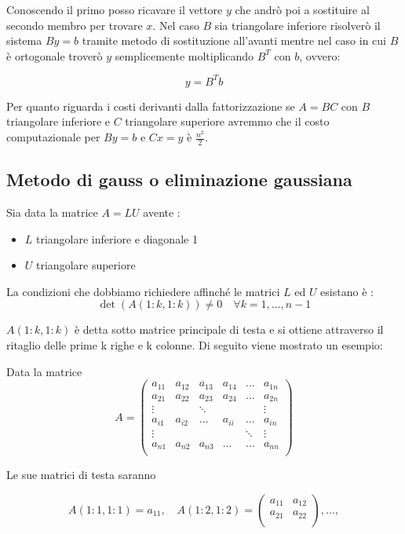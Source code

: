 \documentclass[12pt, a4paper]{book}
\theoremstyle{definition}
\begin{document}
\begin{flushleft}
Conoscendo il primo posso ricavare il vettore $y$ che andrò poi a sostituire al secondo membro per trovare $x$.  Nel caso $B$ sia triangolare inferiore risolverò il sistema $By = b$ tramite metodo di sostituzione all'avanti mentre nel caso in cui $B$ è ortogonale troverò $y$ semplicemente moltiplicando $B^{T}$ con $b$, ovvero:

 \[ 
		y = B^{T}b
\]

Per quanto riguarda i costi derivanti dalla fattorizzazione se $A = BC$ con $B$ triangolare inferiore e $C$ triangolare superiore avremmo che il costo computazionale per $By = b$ e  $Cx = y$ è $\frac{n^{2}}{2}$.
\end{flushleft}

\subsection{Metodo di gauss o eliminazione gaussiana}
\begin{flushleft}

Sia data la matrice $A = LU$  avente : 

\begin{itemize}
	\item $L$ triangolare inferiore e diagonale 1 
	\item $U$ triangolare superiore
\end{itemize}

La condizioni che dobbiamo richiedere affinché le matrici $L$ ed $U$ esistano è :
\[
	\det(A(1:k, 1:k)) \neq 0 \quad \forall k = 1, \dots, n-1
\]

$A(1:k, 1:k)$ è detta sotto matrice principale di testa e si ottiene attraverso il ritaglio delle prime k righe e k colonne. Di seguito viene mostrato un esempio: 

Data la matrice 
\[
	A = 
	\begin{pmatrix}
		a_{11} & a_{12} & a_{13} & a_{14} & \dots & a_{1n} \\
		a_{21} & a_{22} & a_{23} & a_{24} & \dots & a_{2n} \\
		\vdots & & \ddots &  & & \vdots \\
		a_{i1} & a_{i2} & \dots & a_{ii} & \dots & a_{in} \\
		\vdots & & & & \ddots &   \vdots \\
		a_{n1} & a_{n2} & a_{n3} & \dots &  \dots & a_{nn} \\
	\end{pmatrix}
\]

Le sue matrici di testa saranno

\[ 
	A(1:1, 1:1) = a_{11},
	\quad
	A(1:2, 1:2) = 
	\begin{pmatrix}
		a_{11} & a_{12} \\
		a_{21} & a_{22} \\
	\end{pmatrix},
	\dots
	,
\]



\end{flushleft}
\end{document}

